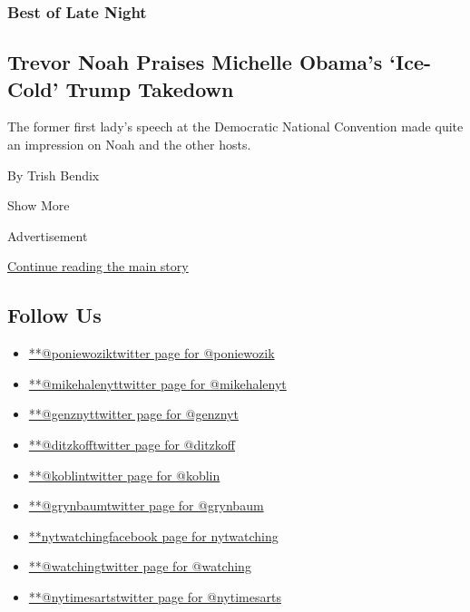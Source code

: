 \begin{enumerate}
  \hypertarget{best-of-late-night-2}{%
  \subsubsection{Best of Late Night}\label{best-of-late-night-2}}

  \hypertarget{trevor-noah-praises-michelle-obamas-ice-cold-trump-takedown}{%
  \subsection{Trevor Noah Praises Michelle Obama's `Ice-Cold' Trump
  Takedown}\label{trevor-noah-praises-michelle-obamas-ice-cold-trump-takedown}}

  The former first lady's speech at the Democratic National Convention
  made quite an impression on Noah and the other hosts.

  By Trish Bendix
\end{enumerate}

Show More

Advertisement

\protect\hyperlink{after-mid2}{Continue reading the main story}

\hypertarget{follow-us}{%
\subsection{Follow Us}\label{follow-us}}

\begin{itemize}
\tightlist
\item
  \href{https://twitter.com/poniewozik}{**@poniewoziktwitter page for
  @poniewozik}
\item
  \href{https://twitter.com/mikehalenyt}{**@mikehalenyttwitter page for
  @mikehalenyt}
\item
  \href{https://twitter.com/genznyt}{**@genznyttwitter page for
  @genznyt}
\item
  \href{https://twitter.com/ditzkoff}{**@ditzkofftwitter page for
  @ditzkoff}
\item
  \href{https://twitter.com/koblin}{**@koblintwitter page for @koblin}
\item
  \href{https://twitter.com/grynbaum}{**@grynbaumtwitter page for
  @grynbaum}
\item
  \href{https://www.facebookcorewwwi.onion/nytwatching}{**nytwatchingfacebook
  page for nytwatching}
\item
  \href{https://twitter.com/watching}{**@watchingtwitter page for
  @watching}
\item
  \href{https://twitter.com/nytimesarts}{**@nytimesartstwitter page for
  @nytimesarts}
\end{itemize}


